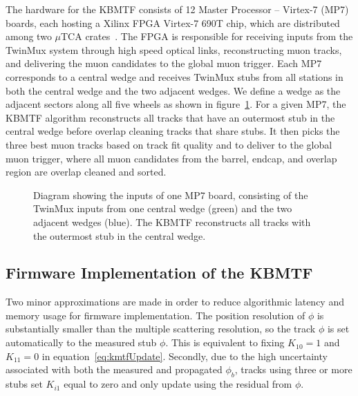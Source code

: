 The hardware for the KBMTF consists of 12 Master Processor -- Virtex-7 (MP7) boards, each hosting a Xilinx FPGA Virtex-7 690T chip, which are distributed among two $\mu$TCA crates~\cite{bmtf_hardware}. The FPGA is responsible for receiving inputs from the TwinMux system through high speed optical links, reconstructing muon tracks, and delivering the muon candidates to the global muon trigger. Each MP7 corresponds to a central wedge and receives TwinMux stubs from all stations in both the central wedge and the two adjacent wedges. We define a wedge as the adjacent sectors along all five wheels as shown in figure~\ref{fig:mu_wedge}. For a given MP7, the KBMTF algorithm reconstructs all tracks that have an outermost stub in the central wedge before overlap cleaning tracks that share stubs. It then picks the three best muon tracks based on track fit quality and \pt to deliver to the global muon trigger, where all muon candidates from the barrel, endcap, and overlap region are overlap cleaned and sorted.

\begin{figure}[htb!]
	\centering
	
	\caption[Diagram showing the inputs of one MP7 board, consisting of the TwinMux inputs from one central wedge (green) and the two adjacent wedges (blue). The KBMTF reconstructs all tracks with the outermost stub in the central wedge.]{Diagram showing the inputs of one MP7 board, consisting of the TwinMux inputs from one central wedge (green) and the two adjacent wedges (blue). The KBMTF reconstructs all tracks with the outermost stub in the central wedge.}
	\label{fig:mu_wedge}
\end{figure}

\subsection{Firmware Implementation of the KBMTF} \label{sec:fw}
Two minor approximations are made in order to reduce algorithmic latency and memory usage for firmware implementation. The position resolution of $\phi$ is substantially smaller than the multiple scattering resolution, so the track $\phi$ is set automatically to the measured stub $\phi$. This is equivalent to fixing $K_{10}=1$ and $K_{11}=0$ in equation~\ref{eq:kmtfUpdate}. Secondly, due to the high uncertainty associated with both the measured and propagated $\phi_b$, tracks using three or more stubs set $K_{i1}$ equal to zero and only update using the residual from $\phi$.

